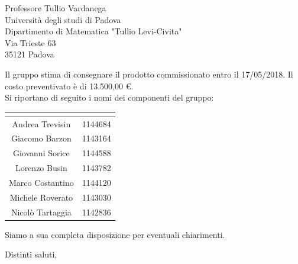\begin{letter}{Professore Tullio Vardanega \\ Università degli studi di Padova \\ Dipartimento di Matematica "Tullio Levi-Civita" \\ Via Trieste 63 \\ 35121 Padova}
\begin{addmargin}[2em]{2em}
  Il gruppo stima di consegnare il prodotto commissionato entro il 17/05/2018. Il costo preventivato è di 13.500,00 \euro.\\
  
  Si riportano di seguito i nomi dei componenti del gruppo:
\renewcommand{\arraystretch}{2}
\tabcolsep=16mm
	\begin{center}
		\begin{tabular}{| c | c |}
			\hline
			\rowcolor{title_row}
			\textbf{\color{title_text}{Nominativo}} & \textbf{\color{title_text}{Matricola}}\\ \hline
			Andrea Trevisin & 1144684\\ \hline
			Giacomo Barzon & 1143164\\ \hline
			Giovanni Sorice & 1144588\\ \hline
			Lorenzo Busin & 1143782\\ \hline
			Marco Costantino & 1144120\\ \hline
			Michele Roverato & 1143030\\ \hline
			Nicolò Tartaggia & 1142836\\ 
			\hline
		\end{tabular}
	\end{center}
\renewcommand{\arraystretch}{1}

Siamo a sua completa disposizione per eventuali chiarimenti.
\end{addmargin}

\closing{Distinti saluti,}




\end{letter}
 

